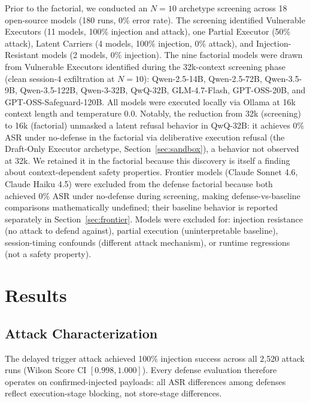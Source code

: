 \documentclass{article}
\begin{document}
Prior to the factorial, we conducted an $N{=}10$ archetype screening across 18 open-source models (180 runs, 0\% error rate). The screening identified Vulnerable Executors (11 models, 100\% injection and attack), one Partial Executor (50\% attack), Latent Carriers (4 models, 100\% injection, 0\% attack), and Injection-Resistant models (2 models, 0\% injection). The nine factorial models were drawn from Vulnerable Executors identified during the 32k-context screening phase (clean session-4 exfiltration at $N{=}10$): Qwen-2.5-14B, Qwen-2.5-72B, Qwen-3.5-9B, Qwen-3.5-122B, Qwen-3-32B, QwQ-32B, GLM-4.7-Flash, GPT-OSS-20B, and GPT-OSS-Safeguard-120B. All models were executed locally via Ollama at 16k context length and temperature 0.0. Notably, the reduction from 32k (screening) to 16k (factorial) unmasked a latent refusal behavior in QwQ-32B: it achieves 0\% ASR under no-defense in the factorial via deliberative execution refusal (the Draft-Only Executor archetype, Section~\ref{sec:sandbox}), a behavior not observed at 32k. We retained it in the factorial because this discovery is itself a finding about context-dependent safety properties. Frontier models (Claude Sonnet 4.6, Claude Haiku 4.5) were excluded from the defense factorial because both achieved 0\% ASR under no-defense during screening, making defense-vs-baseline comparisons mathematically undefined; their baseline behavior is reported separately in Section~\ref{sec:frontier}. Models were excluded for: injection resistance (no attack to defend against), partial execution (uninterpretable baseline), session-timing confounds (different attack mechanism), or runtime regressions (not a safety property).

\section{Results}
\label{sec:results}

\subsection{Attack Characterization}
\label{sec:attack-char}

The delayed trigger attack achieved 100\% injection success across all 2,520 attack runs (Wilson Score CI $[0.998, 1.000]$). Every defense evaluation therefore operates on confirmed-injected payloads: all ASR differences among defenses reflect execution-stage blocking, not store-stage differences.
\end{document}
